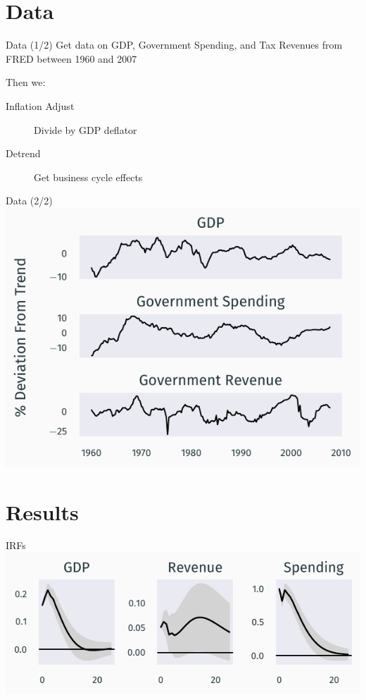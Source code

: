 \documentclass{beamer}
\begin{document}
\section{Data}

\begin{frame}{Data (1/2)}
    Get data on \alert{GDP}, \alert{Government Spending}, and \alert{Tax Revenues} from FRED between 1960 and 2007

    Then we:
    \begin{description}
        \item[Inflation Adjust] Divide by GDP deflator
        \item[Detrend] Get business cycle effects 
    \end{description}
\end{frame}

\begin{frame}{Data (2/2)}
    \centering
    \includegraphics{figures/detrended_data.pdf}
\end{frame}


\section{Results}

\begin{frame}{IRFs} \label{frame:irfs}
    \centering
    \includegraphics{figures/c20_irf.pdf}
    \hyperlink{frame:coefs}{}
\end{frame}
\end{document}

